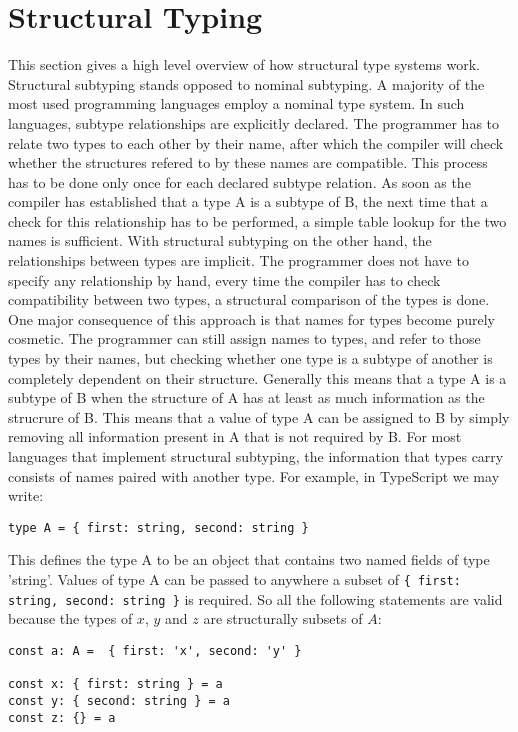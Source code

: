 \section{Structural Typing}
\label{sec:structural-typing}

This section gives a high level overview of how structural type systems work.
Structural subtyping stands opposed to nominal subtyping. 
A majority of the most used programming languages employ a nominal type system.
In such languages, subtype relationships are explicitly declared.
The programmer has to relate two types to each other by their name,
after which the compiler will check whether the structures refered to by these names are compatible.
This process has to be done only once for each declared subtype relation.
As soon as the compiler has established that a type A is a subtype of B,
the next time that a check for this relationship has to be performed, 
a simple table lookup for the two names is sufficient.
\bigskip
With structural subtyping on the other hand, the relationships between types are implicit.
The programmer does not have to specify any relationship by hand,
every time the compiler has to check compatibility between two types, a structural comparison of the types is done.
One major consequence of this approach is that names for types become purely cosmetic.
The programmer can still assign names to types, and refer to those types by their names,
but checking whether one type is a subtype of another is completely dependent on their structure.
Generally this means that a type A is a subtype of B when the structure of A has at least as much information as the strucrure of B.
This means that a value of type A can be assigned to B by simply removing all information present in A that is not required by B.
For most languages that implement structural subtyping, the information that types carry consists of names paired with another type.
For example, in TypeScript we may write:


\begin{lstlisting}
type A = { first: string, second: string }
\end{lstlisting}

This defines the type A to be an object that contains two named fields of type 'string'.
Values of type A can be passed to anywhere a subset of \texttt{\{ first: string, second: string \}} is required.
So all the following statements are valid because the types of $x$, $y$ and $z$ are structurally subsets of $A$:

\begin{lstlisting}
const a: A =  { first: 'x', second: 'y' }

const x: { first: string } = a
const y: { second: string } = a
const z: {} = a
\end{lstlisting}

